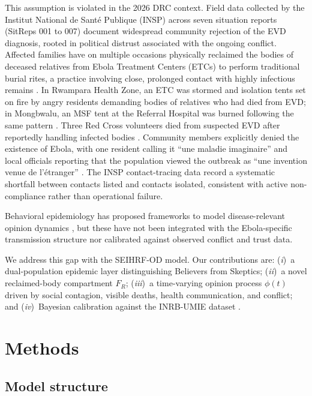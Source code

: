 \documentclass[12pt,a4paper]{article}
\begin{document}
This assumption is violated in the 2026 DRC context. Field data collected
by the Institut National de Santé Publique (INSP) across seven situation
reports (SitReps 001 to 007) document widespread community rejection of the
EVD diagnosis, rooted in political distrust associated with the ongoing
conflict. Affected families have on multiple occasions physically reclaimed
the bodies of deceased relatives from Ebola Treatment Centers (ETCs) to
perform traditional burial rites, a practice involving close, prolonged
contact with highly infectious remains \citep{AlJazeera2026,Euronews2026}.
In Rwampara Health Zone, an ETC was stormed and isolation tents set on fire
by angry residents demanding bodies of relatives who had died from EVD;
in Mongbwalu, an MSF tent at the Referral Hospital was burned following
the same pattern \citep{AlJazeera2026}. Three Red Cross volunteers died
from suspected EVD after reportedly handling infected bodies \citep{NPR2026}.
Community members explicitly denied the existence of Ebola, with one resident
calling it ``une maladie imaginaire'' and local officials reporting that
the population viewed the outbreak as ``une invention venue de l'\'etranger''
\citep{LeDevoir2026,Euronews2026}. The INSP contact-tracing data record
a systematic shortfall between contacts listed and contacts isolated,
consistent with active non-compliance rather than operational failure.

Behavioral epidemiology has proposed frameworks to model disease-relevant
opinion dynamics \citep{Funk2009,Funk2010}, but these have not been
integrated with the Ebola-specific transmission structure nor calibrated
against observed conflict and trust data.

We address this gap with the SEIHRF-OD model. Our contributions are:
(\emph{i})~a dual-population epidemic layer distinguishing Believers from
Skeptics; (\emph{ii})~a novel reclaimed-body compartment $F_R$;
(\emph{iii})~a time-varying opinion process $\phi(t)$ driven by social
contagion, visible deaths, health communication, and conflict; and
(\emph{iv})~Bayesian calibration against the INRB-UMIE dataset
\citep{INRB2026}.

\section{Methods}

\subsection{Model structure}
\end{document}
